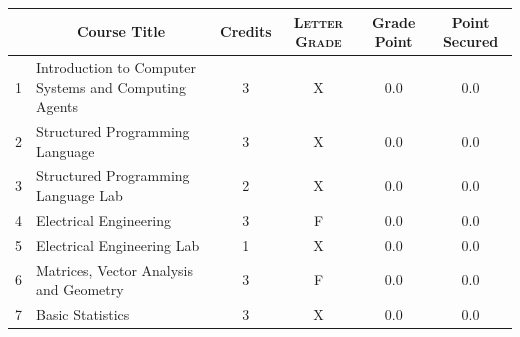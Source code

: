 \documentclass[11pt]{article}
\newcommand*{\numtwo}[1]{\pgfmathprintnumber[
                    fixed, precision=2, fixed zerofill=true]{#1}}
\begin{document}
                \begin{center}
                    \renewcommand{\arraystretch}{1.08}
                    
                \begin{tabular}{|c|l|c|>{\scshape}c|c|c|}
                \hline  \rule[-1ex]{0pt}{3.5ex} {\centering{\bf Course Code}} &  \multicolumn{1}{c|}{\textbf{Course Title}}  & {\bf Credits} & {\bf Letter Grade} & {\bf Grade Point} & {\bf Point Secured}  \\ 
                \hline   1 &  Introduction to Computer Systems and Computing Agents		 & 3 & X & 0.0 & 0.0 \\ %
                \hline   2 &  Structured Programming Language		 & 3 & X & 0.0 & 0.0 \\ %
                \hline   3 &  Structured Programming Language Lab		 & 2 & X & 0.0 & 0.0 \\ %
                \hline   4 &  Electrical Engineering		 & 3 & F & 0.0 & 0.0 \\ %
                \hline   5 &  Electrical Engineering Lab		 & 1 & X & 0.0 & 0.0 \\ %
                \hline   6 &  Matrices, Vector Analysis and Geometry		 & 3 & F & 0.0 & 0.0 \\ %
                \hline   7 &  Basic Statistics		 & 3 & X & 0.0 & 0.0 \\ %

\hline                %
                \end{tabular}
                \end{center}
                \renewcommand{\arraystretch}{1.03}
\end{document}
